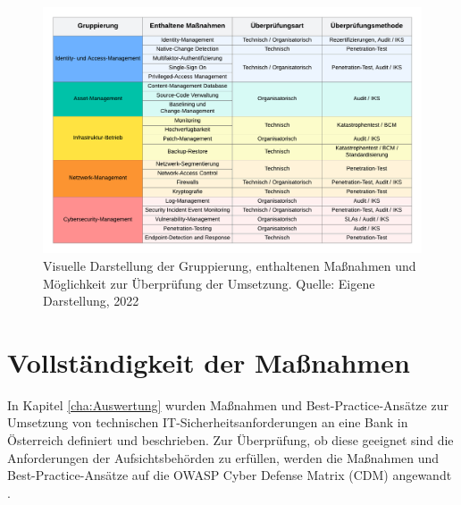 \begin{figure}[H]
    \centering
  \includegraphics[width=\linewidth]{images/uploads/a_figure_16.png}
  \caption{Visuelle Darstellung der Gruppierung, enthaltenen Maßnahmen und Möglichkeit zur Überprüfung der Umsetzung. Quelle: Eigene Darstellung, 2022}
  \label{fig:matrix_ueberpruefung}
\end{figure}

\section{Vollständigkeit der Maßnahmen}
In Kapitel \ref{cha:Auswertung} wurden Maßnahmen und Best-Practice-Ansätze zur Umsetzung von technischen IT-Sicherheitsanforderungen an eine Bank in Österreich definiert und beschrieben. Zur Überprüfung, ob diese geeignet sind die Anforderungen der Aufsichtsbehörden zu erfüllen, werden die Maßnahmen und Best-Practice-Ansätze auf die \glqq{}OWASP Cyber Defense Matrix\grqq{} (CDM) angewandt \autocite{owasp_cyber_defense_matrix}. 
\bigbreak

